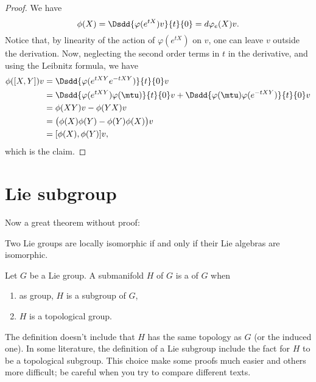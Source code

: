 \begin{proof}
    We have
    \begin{equation}
        \phi(X)=\Dsdd{ \varphi( e^{tX})v }{t}{0}=d\varphi_e(X)v.
    \end{equation}
    Notice that, by linearity of the action of $\varphi( e^{tX})$ on $v$, one can leave $v$ outside the derivation. Now, neglecting the second order terms in $t$ in the derivative, and using the Leibnitz formula, we have
    \begin{equation}
        \begin{aligned}[]
            \phi([X,Y])v    &=  \Dsdd{ \varphi( e^{tXY} e^{-tXY}) }{t}{0}v\\
                    &=  \Dsdd{ \varphi( e^{tXY})\varphi(\mtu) }{t}{0}v+\Dsdd{ \varphi(\mtu)\varphi( e^{-tXY}) }{t}{0}v\\
                    &=  \phi(XY)v-\phi(YX)v\\
                    &=  \big( \phi(X)\phi(Y)-\phi(Y)\phi(X) \big)v\\
                    &=  [\phi(X),\phi(Y)]v,
        \end{aligned}
    \end{equation}
    which is the claim.
\end{proof}

\section{Lie subgroup}

Now a great theorem without proof:
\begin{theorem} \label{tho:loc_isom}
Two Lie groups are locally isomorphic if and only if their Lie algebras are isomorphic.
\end{theorem}

\begin{definition}
Let $G$ be a Lie group. A submanifold $H$ of $G$ is a  of $G$ when
\begin{enumerate}
\item as group, $H$ is a subgroup of $G$,
\item $H$ is a topological group.
\end{enumerate}
\end{definition}

\begin{remark}\label{rem:sub_Lie}
The definition doesn't include that $H$ has the same topology as $G$ (or the induced one). In some literature, the definition of a Lie subgroup include the fact for $H$ to be a topological subgroup. This choice make some proofs much easier and others more difficult; be careful when you try to compare different texts.
\end{remark}

